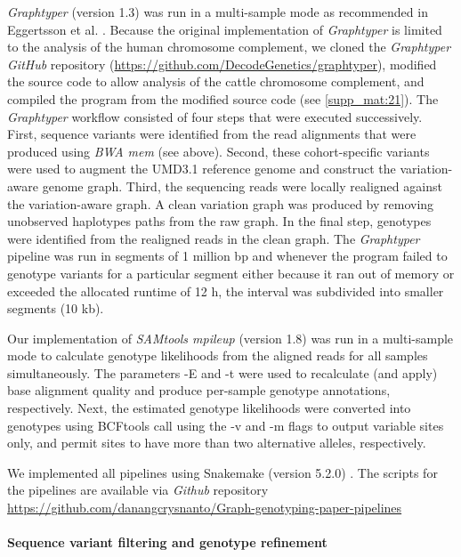 \documentclass[../main.tex]{subfiles}
\begin{document}
\emph{Graphtyper} (version 1.3) was run in a multi-sample mode as recommended in Eggertsson et al. \citep{eggertsson2017graphtyper}. Because the original implementation of \emph{Graphtyper} is limited to the analysis of the human chromosome complement, we cloned the \emph{Graphtyper GitHub} repository (\url{https://github.com/DecodeGenetics/graphtyper}), modified the source code to allow analysis of the cattle chromosome complement, and compiled the program from the modified source code (see \ref{supp_mat:21}). The \emph{Graphtyper} workflow consisted of four steps that were executed successively. First, sequence variants were identified from the read alignments that were produced using \emph{BWA mem} (see above). Second, these cohort-specific variants were used to augment the UMD3.1 reference genome and construct the variation-aware genome graph. Third, the sequencing reads were locally realigned against the variation-aware graph. A clean variation graph was produced by removing unobserved haplotypes paths from the raw graph. In the final step, genotypes were identified from the realigned reads in the clean graph. The  \emph{Graphtyper} pipeline was run in segments of 1 million bp and whenever the program failed to genotype variants for a particular segment either because it ran out of memory or exceeded the allocated runtime of 12 h, the interval was subdivided into smaller segments (10 kb).

Our implementation of \emph{SAMtools mpileup} (version 1.8) \citep{li2011statistical} was run in a multi-sample mode to calculate genotype likelihoods from the aligned reads for all samples simultaneously. The parameters -E and -t were used to recalculate (and apply) base alignment quality and produce per-sample genotype annotations, respectively. Next, the estimated genotype likelihoods were converted into genotypes using BCFtools call using the -v and -m flags to output variable sites only, and permit sites to have more than two alternative alleles, respectively.

We implemented all pipelines using Snakemake (version 5.2.0) \citep{koster2012snakemake}. The scripts for the pipelines are available via \emph{Github} repository \\
\url{https://github.com/danangcrysnanto/Graph-genotyping-paper-pipelines}

\paragraph{Sequence variant filtering and genotype refinement}
\end{document}
